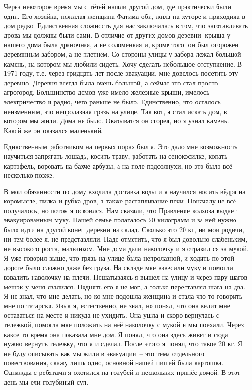 Через некоторое время мы с тётей нашли другой дом, где практически были одни. Его хозяйка, пожилая женщина Фатима-оби, жила на хуторе и приходила в дом редко. Единственная сложность для нас заключалась в том, что заготавливать дрова мы должны были сами. В отличие от других домов деревни, крыша у нашего дома была драночная, а не соломенная и, кроме того, он был огорожен деревянным забором, а не плетнём. Со стороны улицы у забора лежал большой камень, на котором мы любили сидеть. Хочу сделать небольшое отступление. В 1971 году, т.е. через тридцать лет после эвакуации, мне довелось посетить эту деревню. Деревня всегда была очень большой, а сейчас это стал просто агрогород. Большинство домов уже имело железные крыши, имелось электричество и радио, чего раньше не было. Единственно, что осталось неизменным, это непролазная грязь на улице. Так вот, я стал искать дом, в котором мы жили. Дома не было. Оказыватся он сгорел, но я узнал камень. Какой же он оказался маленький.

Единственным работником на первых порах был я. Это дало мне возможность научиться запрягать лошадь, косить траву, работать на сенокосилке, копать картофель, воровать на бахче арбузы, а на поле подсолнухи, но это было всё несколько позже.

В мои обязанности по дому входила доставка воды и я научился носить вёдра на коромысле, пилка и рубка дров, а также растапливание печи. Поначалу не всё получалось, но потом я освоился. Нам сказали, что Правление колхоза выдает эвакуированным муку. Нашей семье полагалось 20 килограмм и за ней нужно было идти на другой конец деревни на склад. Сколько это 20 кг, ни мои родичи, ни тем более я, не представляли. Надо отметить, что я был довольно слабеньким, не высокого роста, мальчиком. Мне дома дали наволочку и я отравил ся за мукой. Я уже говорил выше, что грязь на улице была непролазной, и ходить по этой дороге было сложно даже без груза. На складе мне взвесили муку и помогли взвалить наволочку на плечи. Пошатываясь я вышел на улицу и через пару шагов мешок у меня свалился. Поднять его я не мог, а только переставлял шага на два. Я не знал, что мне делать, но ко мне подошла женщина и стала что-то говорить мне по татарски. Язык я, естественно, не знал, но понял, что она велит мне оставаться на месте и никуда не ухидить. Она ушла и скоро вернулась с тележкой, помогла мне положить на неё наволочку с мукой и мы поехали. Через какое то время она показала мне дом. Я понял, что она здесь живет и сюда нужно вернуть тележку, что я и сделал. После этого я понял, что такое 20 кг. Я не буду описывать как мы жили в эвакуации~-- это тема отдельного повествования, скажу лишь одно, основной нашей пищей была картошка. Однажды с ребятами я охотился на голубей и нескольких принёс домой. В этот день мы ели голубиный суп.

